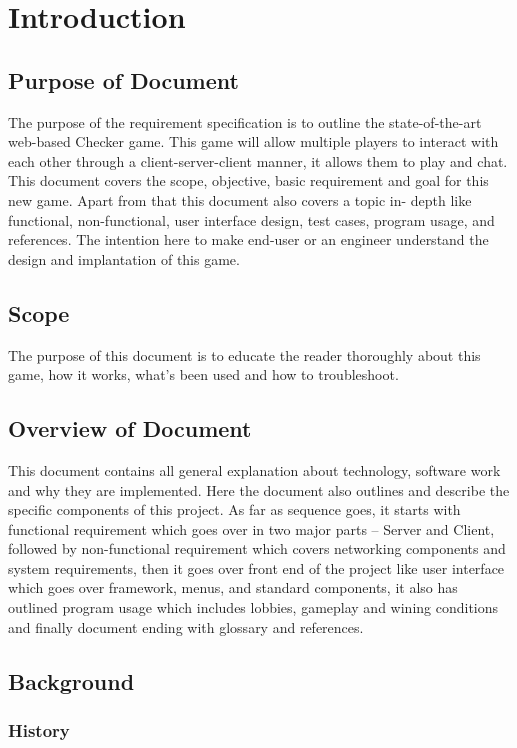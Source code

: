 \documentclass{scrreprt}
\begin{document}
\chapter{Introduction}

\section{Purpose of Document}
The purpose of the requirement specification is to outline the state-of-the-art
web-based Checker game. This game will allow multiple players to interact
with each other through a client-server-client manner, it allows them to play
and chat. This document covers the scope, objective, basic requirement and
goal for this new game. Apart from that this document also covers a topic in-
depth like functional, non-functional, user interface design, test cases,
program usage, and references. The intention here to make end-user or an
engineer understand the design and implantation of this game.

\section{Scope}
The purpose of this document is to educate the reader thoroughly about this
game, how it works, what’s been used and how to troubleshoot.

\section{Overview of Document}
This document contains all general explanation about technology, software
work and why they are implemented. Here the document also outlines and
describe the specific components of this project. As far as sequence goes, it
starts with functional requirement which goes over in two major parts –
Server and Client, followed by non-functional requirement which covers
networking components and system requirements, then it goes over front end
of the project like user interface which goes over framework, menus, and
standard components, it also has outlined program usage which includes
lobbies, gameplay and wining conditions and finally document ending with
glossary and references.

\section{Background}

\subsection{History}
\end{document}
